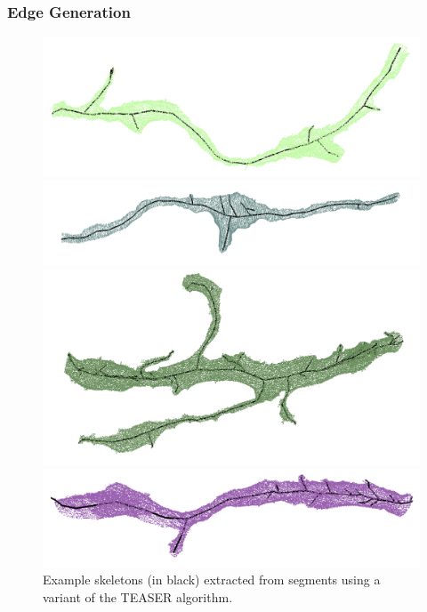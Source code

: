 \subsubsection{Edge Generation}

\begin{figure}[t]
	\centering
	\begin{minipage}{0.45\linewidth}
		\includegraphics[width=\linewidth]{./figures/skeleton1.png}		
	\end{minipage}
	\hfill
	\begin{minipage}{0.45\linewidth}
		\includegraphics[width=\linewidth]{./figures/skeleton2.png}		
	\end{minipage}
	\begin{minipage}{0.45\linewidth}
		\includegraphics[width=\linewidth]{./figures/skeleton3.png}		
	\end{minipage}
	\hfill
	\begin{minipage}{0.45\linewidth}
		\includegraphics[width=\linewidth]{./figures/skeleton4.png}		
	\end{minipage}
	\caption{Example skeletons (in black) extracted from segments using a variant of the TEASER algorithm.}
	\label{fig:skeletonization}
\end{figure}

